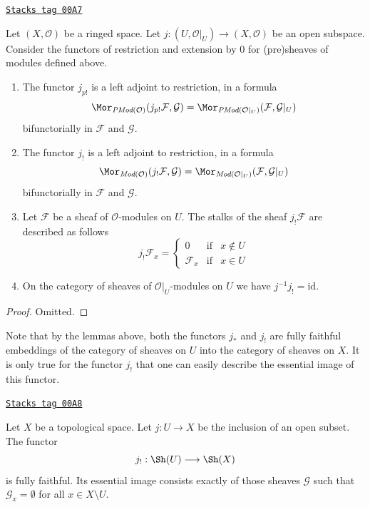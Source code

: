 \begin{lemma}
\label{sheaves-lemma-j-shriek-modules}
\href{https://stacks.math.columbia.edu/tag/00A7}{\texttt{Stacks tag 00A7}}

Let $(X, \mathcal{O})$ be a ringed space.
Let $j : (U, \mathcal{O}|_U) \to (X, \mathcal{O})$
be an open subspace.
Consider the functors of restriction and extension
by $0$ for (pre)sheaves of modules defined above.
\begin{enumerate}
\item The functor $j_{p!}$ is a left adjoint to restriction,
in a formula
$$
\Mor_{\textit{PMod}(\mathcal{O})}(j_{p!}\mathcal{F}, \mathcal{G})
=
\Mor_{\textit{PMod}(\mathcal{O}|_U)}(\mathcal{F}, \mathcal{G}|_U)
$$
bifunctorially in $\mathcal{F}$ and $\mathcal{G}$.
\item The functor $j_!$ is a left adjoint to restriction,
in a formula
$$
\Mor_{\textit{Mod}(\mathcal{O})}(j_!\mathcal{F}, \mathcal{G})
=
\Mor_{\textit{Mod}(\mathcal{O}|_U)}(\mathcal{F}, \mathcal{G}|_U)
$$
bifunctorially in $\mathcal{F}$ and $\mathcal{G}$.
\item Let $\mathcal{F}$ be a sheaf of $\mathcal{O}$-modules on $U$.
The stalks of the sheaf $j_!\mathcal{F}$ are described
as follows
$$
j_{!}\mathcal{F}_x =
\left\{
\begin{matrix}
0 & \text{if} & x \not \in U \\
\mathcal{F}_x & \text{if} & x \in U
\end{matrix}
\right.
$$
\item On the category of sheaves of $\mathcal{O}|_U$-modules on $U$
we have $j^{-1}j_! = \text{id}$.
\end{enumerate}
\end{lemma}

\begin{proof}
Omitted.
\end{proof}

Note that by the lemmas above, both the functors
$j_*$ and $j_!$ are fully faithful embeddings of
the category of sheaves on $U$ into the category
of sheaves on $X$. It is only true for the functor
$j_!$ that one can easily describe the essential
image of this functor.

\begin{lemma}
\label{sheaves-lemma-equivalence-categories-open}
\href{https://stacks.math.columbia.edu/tag/00A8}{\texttt{Stacks tag 00A8}}

Let $X$ be a topological space.
Let $j : U \to X$ be the inclusion of an open subset.
The functor
$$
j_! : \Sh(U) \longrightarrow \Sh(X)
$$
is fully faithful. Its essential image consists exactly
of those sheaves $\mathcal{G}$ such that
$\mathcal{G}_x = \emptyset$ for all $x \in X \setminus U$.
\end{lemma}

